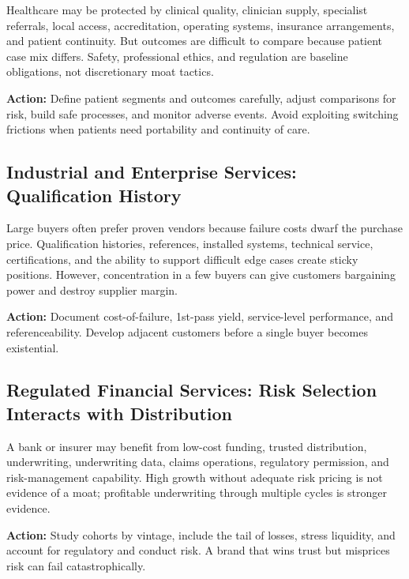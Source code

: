 Healthcare may be protected by clinical quality, clinician supply, specialist referrals, local access, accreditation, operating systems, insurance arrangements, and patient continuity. But outcomes are difficult to compare because patient case mix differs. Safety, professional ethics, and regulation are baseline obligations, not discretionary moat tactics.

\vspace{0.5em}
\noindent\textbf{Action:} Define patient segments and outcomes carefully, adjust comparisons for risk, build safe processes, and monitor adverse events. Avoid exploiting switching frictions when patients need portability and continuity of care.

\subsection{Industrial and Enterprise Services: Qualification History}
\label{sec:industrial_enterprise_services_qualification}

Large buyers often prefer proven vendors because failure costs dwarf the purchase price. Qualification histories, references, installed systems, technical service, certifications, and the ability to support difficult edge cases create sticky positions. However, concentration in a few buyers can give customers bargaining power and destroy supplier margin.

\vspace{0.5em}
\noindent\textbf{Action:} Document cost-of-failure, 1st-pass yield, service-level performance, and referenceability. Develop adjacent customers before a single buyer becomes existential.

\subsection{Regulated Financial Services: Risk Selection Interacts with Distribution}
\label{sec:financial_services_distribution_risk}

A bank or insurer may benefit from low-cost funding, trusted distribution, underwriting, underwriting data, claims operations, regulatory permission, and risk-management capability. High growth without adequate risk pricing is not evidence of a moat; profitable underwriting through multiple cycles is stronger evidence.

\vspace{0.5em}
\noindent\textbf{Action:} Study cohorts by vintage, include the tail of losses, stress liquidity, and account for regulatory and conduct risk. A brand that wins trust but misprices risk can fail catastrophically.

